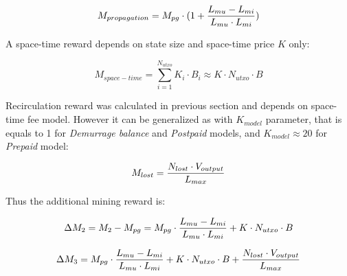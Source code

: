 \documentclass[]{article}   %
\newcommand{\esse}{\textit{SSE}}
\newcommand{\ignore}[1]{} %
\begin{document}
\begin{equation}
M_{propagation} = M_{pg} \cdot(1 + {{L_{mu}-L_{mi}} \over {L_{mu} \cdot L_{mi}}})
\end{equation}



\ignore{
  In Section \ref{sec:flow} we have noticed, that \esse{} users have an incentive to actively use their coins and propagation reward is correlated with space-time reward:

  \begin{equation}
    M_{propagation} = r_{flow} \cdot M_{space-time} + M_{pg}
  \end{equation}

  where $C$ is non-negative constant. 
}

A space-time reward depends on state size and space-time price $K$ only:

\begin{equation}
M_{space-time} = \sum_{i=1}^{N_{utxo}} K_i \cdot B_i \approx K \cdot N_{utxo} \cdot B
\end{equation}

Recirculation reward was calculated in previous section and depends on space-time fee model. However it can be generalized as with $K_{model}$ parameter, that is equals to 1 for \textit{Demurrage balance} and \textit{Postpaid} models, and $K_{model} \approx 20$ for \textit{Prepaid} model:

\begin{equation}
M_{lost} = {N_{lost} \cdot V_{output} \over L_{max}}
\end{equation}

Thus the additional mining reward is:

\begin{equation}
\Delta M_2 = M_2 - M_{pg} = M_{pg} \cdot {{L_{mu}-L_{mi}} \over {L_{mu} \cdot L_{mi}}} + K \cdot N_{utxo} \cdot B
\end{equation}

\begin{equation}
\Delta M_3 = M_{pg} \cdot {{L_{mu}-L_{mi}} \over {L_{mu} \cdot L_{mi}}} + K \cdot N_{utxo} \cdot B + {N_{lost} \cdot V_{output} \over L_{max}}
\end{equation}
\end{document}
